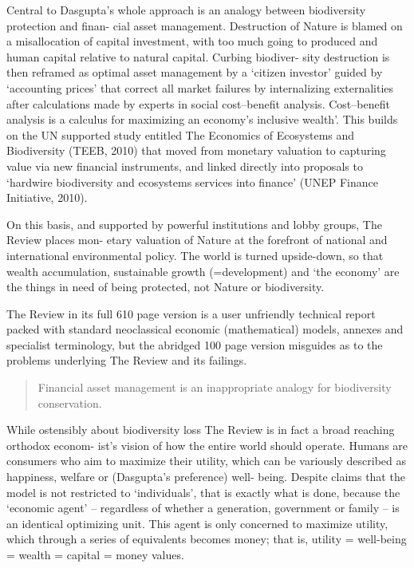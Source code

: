 \documentclass[
]{book}
\begin{document}
Central to Dasgupta's whole approach is an analogy between biodiversity protection and finan-
cial asset management. Destruction of Nature is blamed on a misallocation of capital investment,
with too much going to produced and human capital relative to natural capital. Curbing biodiver-
sity destruction is then reframed as optimal asset management by a `citizen investor' guided by
`accounting prices' that correct all market failures by internalizing externalities after calculations
made by experts in social cost--benefit analysis.
Cost--benefit analysis is a calculus for maximizing an economy's inclusive wealth'. This
builds on the UN supported study entitled The Economics of Ecosystems and Biodiversity (TEEB,
2010) that moved from monetary valuation to capturing value via new financial instruments,
and linked directly into proposals to `hardwire biodiversity and ecosystems services into finance'
(UNEP Finance Initiative, 2010).

On this basis, and supported by powerful institutions and lobby groups, The Review places mon-
etary valuation of Nature at the forefront of national and international environmental policy. The
world is turned upside-down, so that wealth accumulation, sustainable growth (=development) and
`the economy' are the things in need of being protected, not Nature or biodiversity.

The Review in its full 610 page version is a user unfriendly technical report packed with standard
neoclassical economic (mathematical) models, annexes and specialist terminology, but the
abridged 100 page version misguides as to the problems underlying The Review and its failings.

\begin{quote}
Financial asset management is an
inappropriate analogy for biodiversity conservation.
\end{quote}

While ostensibly about biodiversity loss The Review is in fact a broad reaching orthodox econom-
ist's vision of how the entire world should operate. Humans are consumers who aim to maximize
their utility, which can be variously described as happiness, welfare or (Dasgupta's preference) well-
being. Despite claims that the model is not restricted to `individuals', that is exactly what is done,
because the `economic agent' -- regardless of whether a generation, government or family -- is an
identical optimizing unit. This agent is only concerned to maximize utility, which through a series
of equivalents becomes money; that is, utility = well-being = wealth = capital = money values.
\end{document}
